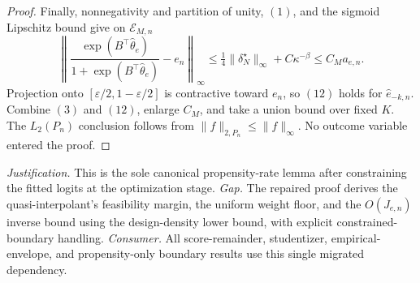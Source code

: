 \documentclass{article}
\begin{document}
\begin{proof}
Finally, nonnegativity and partition of unity, \((1)\), and the sigmoid Lipschitz bound give on \(\mathcal E_{M,n}\)
\[\left\lVert\frac{\exp(B^\top\widehat\theta_e)}{1+\exp(B^\top\widehat\theta_e)}-e_n\right\rVert_\infty\le\tfrac14\lVert\delta_N^\star\rVert_\infty+C\kappa^{-\beta}\le C_Ma_{e,n}.\tag{12}\]
Projection onto \([\varepsilon/2,1-\varepsilon/2]\) is contractive toward \(e_n\), so \((12)\) holds for \(\widehat e_{-k,n}\). Combine \((3)\) and \((12)\), enlarge \(C_M\), and take a union bound over fixed \(K\). The \(L_2(P_n)\) conclusion follows from \(\lVert f\rVert_{2,P_n}\le\lVert f\rVert_\infty\). No outcome variable entered the proof.
\end{proof}
\par\smallskip\noindent \textit{Justification.} This is the sole canonical propensity-rate lemma after constraining the fitted logits at the optimization stage. \textit{Gap.} The repaired proof derives the quasi-interpolant's feasibility margin, the uniform weight floor, and the \(O(J_{e,n})\) inverse bound using the design-density lower bound, with explicit constrained-boundary handling. \textit{Consumer.} All score-remainder, studentizer, empirical-envelope, and propensity-only boundary results use this single migrated dependency.
\end{document}
